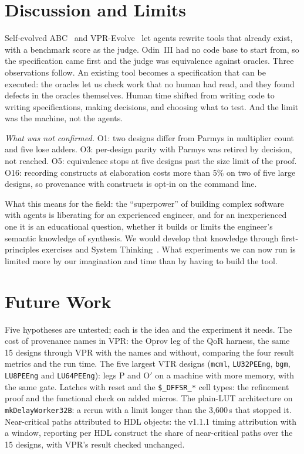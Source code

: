 \documentclass[conference]{IEEEtran}
\newcommand{\code}[1]{\texttt{#1}}
\begin{document}
\section{Discussion and Limits}
\label{sec:discussion}

Self-evolved ABC~\cite{yu2026selfevolvedabc} and VPR-Evolve~\cite{wu2026vprevolve} let agents rewrite tools that already exist, with a benchmark score as the judge. Odin~III had no code base to start from, so the specification came first and the judge was equivalence against oracles. Three observations follow. An existing tool becomes a specification that can be executed: the oracles let us check work that no human had read, and they found defects in the oracles themselves. Human time shifted from writing code to writing specifications, making decisions, and choosing what to test. And the limit was the machine, not the agents.

\emph{What was not confirmed.} O1: two designs differ from Parmys in multiplier count and five lose adders. O3: per-design parity with Parmys was retired by decision, not reached. O5: equivalence stops at five designs past the size limit of the proof. O16: recording constructs at elaboration costs more than 5\% on two of five large designs, so provenance with constructs is opt-in on the command line.

What this means for the field: the ``superpower'' of building complex software with agents is liberating for an experienced engineer, and for an inexperienced one it is an educational question, whether it builds or limits the engineer's semantic knowledge of synthesis. We would develop that knowledge through first-principles exercises and System Thinking~\cite{cabrera2015systems}. What experiments we can now run is limited more by our imagination and time than by having to build the tool.

\section{Future Work}
\label{sec:future}

Five hypotheses are untested; each is the idea and the experiment it needs. The cost of provenance names in VPR: the Oprov leg of the QoR harness, the same 15 designs through VPR with the names and without, comparing the four result metrics and the run time. The five largest VTR designs (\code{mcml}, \code{LU32PEEng}, \code{bgm}, \code{LU8PEEng} and \code{LU64PEEng}): legs P and O$'$ on a machine with more memory, with the same gate. Latches with reset and the \code{\$\_DFFSR\_*} cell types: the refinement proof and the functional check on added micros. The plain-LUT architecture on \code{mkDelayWorker32B}: a rerun with a limit longer than the 3,600\,s that stopped it. Near-critical paths attributed to HDL objects: the v1.1.1 timing attribution with a window, reporting per HDL construct the share of near-critical paths over the 15 designs, with VPR's result checked unchanged.
\end{document}
